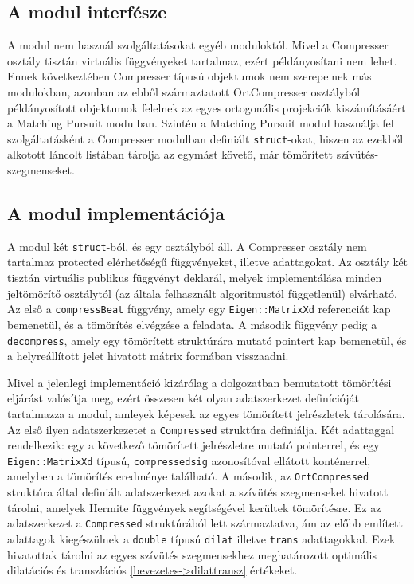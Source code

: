 \documentclass[oneside,titlepage,12pt,a4paper]{report}
\begin{document}
\subsection*{A modul interfésze}

\par A modul nem használ szolgáltatásokat egyéb moduloktól. Mivel a Compresser osztály tisztán virtuális függvényeket tartalmaz, ezért példányosítani nem lehet. Ennek következtében Compresser típusú objektumok nem szerepelnek más modulokban, azonban az ebből származtatott OrtCompresser osztályból példányosított objektumok felelnek az egyes ortogonális projekciók kiszámításáért a Matching Pursuit modulban. Szintén a Matching Pursuit modul használja fel szolgáltatásként a Compresser modulban definiált \texttt{struct}-okat, hiszen az ezekből alkotott láncolt listában tárolja az egymást követő, már tömörített szívütés-szegmenseket. 

\subsection*{A modul implementációja}

\par A modul két \texttt{struct}-ból, és egy osztályból áll. A Compresser osztály nem tartalmaz protected elérhetőségű függvényeket, illetve adattagokat. Az osztály két tisztán virtuális publikus függvényt deklarál, melyek implementálása minden jeltömörítő osztálytól (az általa felhasznált algoritmustól függetlenül) elvárható. Az első a \texttt{compressBeat} függvény, amely egy \texttt{Eigen::MatrixXd} referenciát kap bemenetül, és a tömörítés elvégzése a feladata. A második függvény pedig a \texttt{decompress}, amely egy tömörített struktúrára mutató pointert kap bemenetül, és a helyreállított jelet hivatott mátrix formában visszaadni. 
\par Mivel a jelenlegi implementáció kizárólag a dolgozatban bemutatott tömörítési eljárást valósítja meg, ezért összesen két olyan adatszerkezet definícióját tartalmazza a modul, amleyek képesek az egyes tömörített jelrészletek tárolására. Az első ilyen adatszerkezetet a \texttt{Compressed} struktúra definiálja. Két adattaggal rendelkezik: egy a következő tömörített jelrészletre mutató pointerrel, és egy \texttt{Eigen::MatrixXd} típusú, \texttt{compressedsig} azonosítóval ellátott konténerrel, amelyben a tömörítés eredménye található. A második, az \texttt{OrtCompressed} struktúra által definiált adatszerkezet azokat a szívütés szegmenseket hivatott tárolni, amelyek Hermite függvények segítségével kerültek tömörítésre. Ez az adatszerkezet a \texttt{Compressed} struktúrából lett származtatva, ám az előbb említett adattagok kiegészülnek a \texttt{double} típusú \texttt{dilat} illetve \texttt{trans} adattagokkal. Ezek hivatottak tárolni az egyes szívütés szegmensekhez meghatározott optimális dilatációs és transzlációs \ref{bevezetes->dilattransz} értékeket.     
\end{document}
